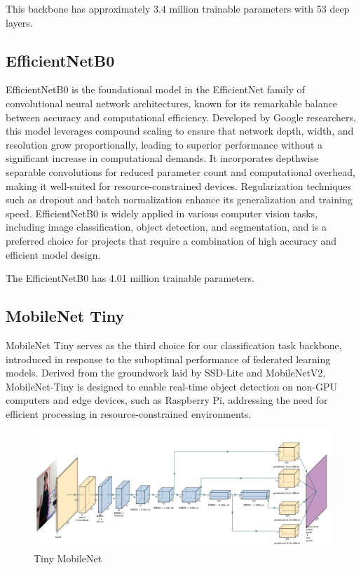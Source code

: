 \documentclass[runningheads,a4paper,11pt]{report}
\begin{document}
This backbone has approximately 3.4 million trainable parameters with 53 deep layers.
\subsection{EfficientNetB0}

EfficientNetB0 \cite{tan2019efficientnet} is the foundational model in the EfficientNet family of convolutional neural network architectures, known for its remarkable balance between accuracy and computational efficiency. Developed by Google researchers, this model leverages compound scaling to ensure that network depth, width, and resolution grow proportionally, leading to superior performance without a significant increase in computational demands. It incorporates depthwise separable convolutions for reduced parameter count and computational overhead, making it well-suited for resource-constrained devices. Regularization techniques such as dropout and batch normalization enhance its generalization and training speed. EfficientNetB0 is widely applied in various computer vision tasks, including image classification, object detection, and segmentation, and is a preferred choice for projects that require a combination of high accuracy and efficient model design.

The EfficientNetB0 has 4.01 million trainable parameters.

\subsection{MobileNet Tiny}

MobileNet Tiny \cite{howard2017mobilenets} serves as the third choice for our classification task backbone, introduced in response to the suboptimal performance of federated learning models. Derived from the groundwork laid by SSD-Lite and MobileNetV2, MobileNet-Tiny is designed to enable real-time object detection on non-GPU computers and edge devices, such as Raspberry Pi, addressing the need for efficient processing in resource-constrained environments.

\begin{figure}[h]
    \centering
    \includegraphics[scale=0.5]{images/tiny.png} 
    \caption{Tiny MobileNet}
\end{figure}
\end{document}
